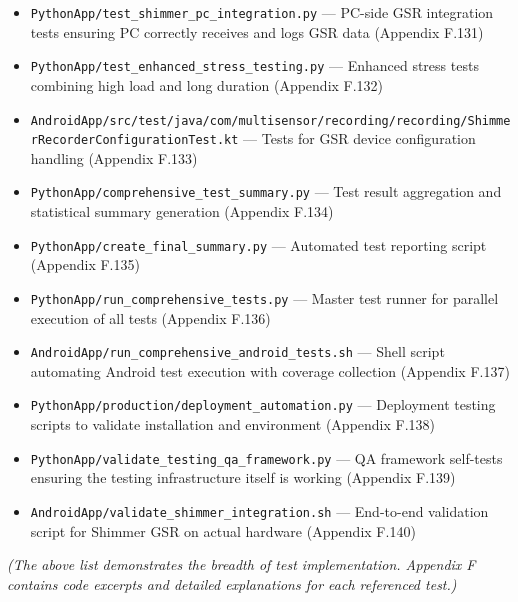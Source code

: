 \documentclass[11pt,a4paper]{report}
\begin{document}
{{\begin{itemize}
  --- Session lifecycle and persistence tests (Appendix F.130)
\item \texttt{PythonApp/test\_shimmer\_pc\_integration.py} --- PC-side GSR integration
  tests ensuring PC correctly receives and logs GSR data (Appendix
  F.131)
\item \texttt{PythonApp/test\_enhanced\_stress\_testing.py} --- Enhanced stress tests
  combining high load and long duration (Appendix F.132)
\item \texttt{AndroidApp/src/test/java/com/multisensor/recording/recording/ShimmerRecorderConfigurationTest.kt}
  --- Tests for GSR device configuration handling (Appendix F.133)
\item \texttt{PythonApp/comprehensive\_test\_summary.py} --- Test result aggregation
  and statistical summary generation (Appendix F.134)
\item \texttt{PythonApp/create\_final\_summary.py} --- Automated test reporting script
  (Appendix F.135)
\item \texttt{PythonApp/run\_comprehensive\_tests.py} --- Master test runner for
  parallel execution of all tests (Appendix F.136)
\item \texttt{AndroidApp/run\_comprehensive\_android\_tests.sh} --- Shell script
  automating Android test execution with coverage collection (Appendix
  F.137)
\item \texttt{PythonApp/production/deployment\_automation.py} --- Deployment testing
  scripts to validate installation and environment (Appendix F.138)
\item \texttt{PythonApp/validate\_testing\_qa\_framework.py} --- QA framework
  self-tests ensuring the testing infrastructure itself is working
  (Appendix F.139)
\item \texttt{AndroidApp/validate\_shimmer\_integration.sh} --- End-to-end validation
  script for Shimmer GSR on actual hardware (Appendix F.140)

\end{itemize}
\textit{(The above list demonstrates the breadth of test implementation.
Appendix F contains code excerpts and detailed explanations for each
referenced test.)}

}}
\end{document}
